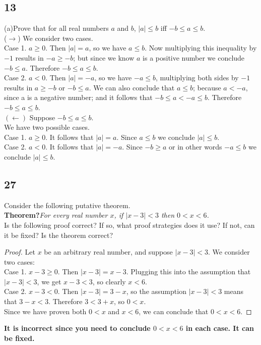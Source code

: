 \documentclass{article}
\begin{document}
\subsection{13}
(a)Prove that for all real numbers $a$ and $b$, $|a|\leq b$ iff $-b \leq a \leq b$. $ $\\
($\rightarrow$) We consider two cases.
$ $\\
Case 1. $a \geq 0$. Then $|a|=a$, so we have $a \leq b$. Now multiplying this inequality by $-1$ results in $-a \geq -b$; but since we know $a$ is a positive number we conclude $-b \leq a$. Therefore $-b \leq a \leq b$. $ $ \\
Case 2. $a < 0$. Then $|a|=-a$, so we have $-a \leq b$, multiplying both sides by $-1$ results in $a \geq -b$ or $ -b \leq a$. We can also conclude that $a \leq b$; because $a < -a$, since a is a negative number; and it follows that $-b \leq a < -a \leq b$. Therefore  $-b \leq a \leq b$.
$ $ \\
$(\leftarrow)$ Suppose $-b \leq a \leq b$.
$ $\\
We have two possible cases.
$ $\\
Case 1. $a \geq 0$. It follows that $|a|=a$. Since $a \leq b$ we conclude $|a|\leq b$.
$ $\\
Case 2. $a < 0$. It follows that $|a|= -a$. Since $-b \geq a$ or in other words $-a  \leq b$ we conclude $|a| \leq b$.
\newpage
\subsection{27}
Consider the following putative theorem.
$ $\\
\textbf{Theorem?}\textit{For every real number $x$, if $|x-3|<3$ then $0<x<6$.}
$ $ \\
Is the following proof correct? If so, what proof strategies does it use? If not, can it be fixed? Is the theorem correct?
\begin{proof}
Let $x$ be an arbitrary real number, and suppose $|x-3|<3$. We consider two cases: $ $\\
Case 1. $x-3 \geq 0$. Then $|x-3| = x-3$. Plugging this into the assumption that $|x-3|<3$, we get $x-3<3$, so clearly $x<6$. $ $\\
Case 2. $x-3 <0$. Then $|x-3|=3-x$, so the assumption $|x-3|<3$ means that $3-x < 3$. Therefore $3 < 3 +x$, so $0 <x $.
$ $\\
Since we have proven both $0<x$ and $x <6$, we can conclude that $0<x<6$.
\end{proof}
 \textbf{It is incorrect since you need to conclude $0<x<6$ in each case. It can be fixed.}
\end{document}
